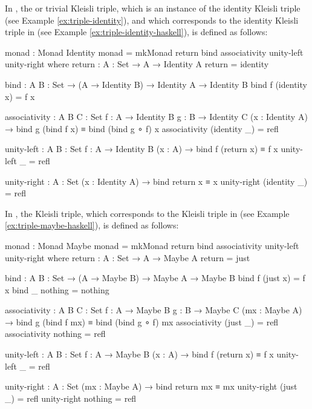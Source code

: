 \begin{example}
  \label{ex:triple-identity-agda}

  In \agda, the  or trivial Kleisli triple, which
  is an instance of the identity Kleisli triple (see Example
  \ref{ex:triple-identity}), and which corresponds to the identity
  Kleisli triple in \hask (see Example
  \ref{ex:triple-identity-haskell}), is defined as follows:
  \begin{codeagda}
monad : Monad Identity
monad = mkMonad return bind associativity unity-left unity-right
  where
    return : {A : Set} → A → Identity A
    return = identity

    bind : {A B : Set} → (A → Identity B) → Identity A → Identity B
    bind f (identity x) = f x

    associativity : {A B C : Set} {f : A → Identity B}
                    {g : B → Identity C} (x : Identity A) →
                    bind g (bind f x) ≡ bind (bind g ∘ f) x
    associativity (identity _) = refl

    unity-left : {A B : Set} {f : A → Identity B} (x : A) →
                 bind f (return x) ≡ f x
    unity-left _ = refl

    unity-right : {A : Set} (x : Identity A) → bind return x ≡ x
    unity-right (identity _) = refl
  \end{codeagda}
\end{example}

\begin{example}
  \label{ex:triple-maybe-agda}

  In \agda, the  Kleisli triple, which corresponds to
  the  Kleisli triple in \hask (see Example
  \ref{ex:triple-maybe-haskell}), is defined as follows:
  \begin{codeagda}
monad : Monad Maybe
monad = mkMonad return bind associativity unity-left unity-right
  where
    return : {A : Set} → A → Maybe A
    return = just

    bind : {A B : Set} → (A → Maybe B) → Maybe A → Maybe B
    bind f (just x) = f x
    bind _ nothing  = nothing

    associativity : {A B C : Set} {f : A → Maybe B} {g : B → Maybe C}
                    (mx : Maybe A) →
                    bind g (bind f mx) ≡ bind (bind g ∘ f) mx
    associativity (just _) = refl
    associativity nothing  = refl

    unity-left : {A B : Set} {f : A → Maybe B} (x : A) →
                 bind f (return x) ≡ f x
    unity-left _ = refl

    unity-right : {A : Set} (mx : Maybe A) → bind return mx ≡ mx
    unity-right (just _) = refl
    unity-right nothing  = refl
  \end{codeagda}

\end{example}

